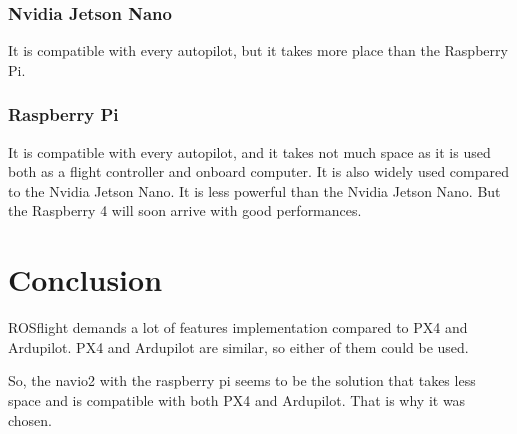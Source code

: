         \subsubsection{Nvidia Jetson Nano}
        It is compatible with every autopilot, but it takes more place than the Raspberry Pi.

        \subsubsection{Raspberry Pi}
        It is compatible with every autopilot, and it takes not much space as it is used both as a flight controller and onboard computer.
        It is also widely used compared to the Nvidia Jetson Nano.
        It is less powerful than the Nvidia Jetson Nano. But the Raspberry 4 will soon arrive with good performances.

\section{Conclusion}
ROSflight demands a lot of features implementation compared to PX4 and Ardupilot.
PX4 and Ardupilot are similar, so either of them could be used.

So, the navio2 with the raspberry pi seems to be the solution that takes less space and is compatible with both PX4 and Ardupilot.
That is why it was chosen.